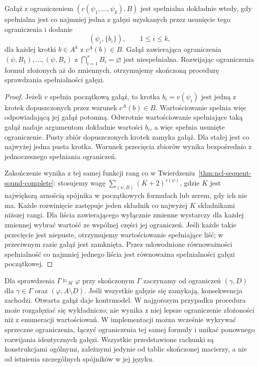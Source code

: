 \begin{twierdzenie}
\label{thm:ncl-matrix-tableau}
Gałąź z ograniczeniem $(c(\psi_1,\ldots,\psi_k),B)$
jest spełnialna dokładnie wtedy, gdy spełnialna
jest co najmniej jedna z gałęzi uzyskanych przez
usunięcie tego ograniczenia i dodanie
\[
 (\psi_i,\{b_i\}),\qquad 1\leq i\leq k,
\]
dla każdej krotki $b\in A^k$ z $c^A(b)\in B$.
Gałąź zawierająca ograniczenia $(\psi,B_1),\ldots,
(\psi,B_s)$ z $\bigcap_{i=1}^s B_i=\varnothing$
jest niespełnialna.
Rozwijając ograniczenia formuł złożonych aż do
zmiennych, otrzymujemy skończoną procedurę
sprawdzania spełnialności gałęzi.
\end{twierdzenie}
\begin{proof}
Jeżeli $v$ spełnia początkową gałąź, to krotka
$b_i=v(\psi_i)$ jest jedną z krotek dopuszczonych
przez warunek $c^A(b)\in B$. Wartościowanie
spełnia więc odpowiadającą jej gałąź potomną.
Odwrotnie wartościowanie spełniające taką gałąź
nadaje argumentom dokładnie wartości $b_i$,
a więc spełnia usunięte ograniczenie.
Pusty zbiór dopuszczonych krotek zamyka gałąź.
Dla stałej jest co najwyżej jedna pusta krotka.
Warunek przecięcia zbiorów wynika bezpośrednio
z jednoczesnego spełniania ograniczeń.

Zakończenie wynika z tej samej funkcji rang co w
Twierdzeniu~\ref{thm:ncl-sequent-sound-complete}:
stosujemy wagę $\sum_{(\psi,B)}(K+2)^{r(\psi)}$,
gdzie $K$ jest największą arnością spójnika
w początkowych formułach lub zerem, gdy ich nie ma.
Każde rozwinięcie zastępuje jeden składnik
co najwyżej $K$ składnikami niższej rangi.
Dla liścia zawierającego wyłącznie zmienne
wystarczy dla każdej zmiennej wybrać wartość
ze wspólnej części jej ograniczeń.
Jeśli każde takie przecięcie jest niepuste,
otrzymujemy wartościowanie spełniające liść;
w przeciwnym razie gałąź jest zamknięta.
Przez udowodnione równoważności spełnialność
co najmniej jednego liścia jest równoważna
spełnialności gałęzi początkowej.
\end{proof}
Dla sprawdzenia $\Gamma\models_{\mathcal M}\varphi$
przy skończonym $\Gamma$ zaczynamy od ograniczeń $(\gamma,D)$ dla $\gamma\in\Gamma$
oraz $(\varphi,A\setminus D)$.
Jeśli wszystkie gałęzie się zamykają, konsekwencja
zachodzi. Otwarta gałąź daje kontrmodel.
W najgorszym przypadku procedura może rozgałęziać
się wykładniczo; nie wynika z niej lepsze ograniczenie
złożoności niż z enumeracji wartościowań.
W implementacji można wcześnie wykrywać sprzeczne
ograniczenia, łączyć ograniczenia tej samej formuły
i unikać ponownego rozwijania identycznych gałęzi.
Wszystkie przedstawione rachunki są konstrukcjami
ogólnymi, zależnymi jedynie od tablic skończonej macierzy,
a nie od istnienia szczególnych spójników w jej języku.
